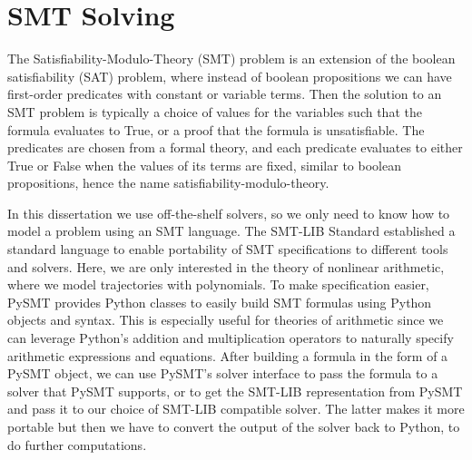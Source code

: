 \section{SMT Solving}
The Satisfiability-Modulo-Theory (SMT) problem is an extension of the boolean satisfiability (SAT) problem, where instead of boolean propositions we can have first-order predicates with constant or variable terms.
%
Then the solution to an SMT problem is typically a choice of values for the variables such that the formula evaluates to True, or a proof that the formula is unsatisfiable.
%
The predicates are chosen from a formal theory, and each predicate evaluates to either True or False when the values of its terms are fixed, similar to boolean propositions, hence the name satisfiability-modulo-theory.



In this dissertation we use off-the-shelf solvers, so we only need to know how to model a problem using an SMT language.
%
The SMT-LIB Standard \cite{Barrett.2010} established a standard language to enable portability of SMT specifications to different tools and solvers.
%
Here, we are only interested in the theory of nonlinear arithmetic, where we model trajectories with polynomials.
%
To make specification easier, PySMT \cite{PySMT.2015} provides Python classes to easily build SMT formulas using Python objects and syntax.
%
This is especially useful for theories of arithmetic since we can leverage Python's addition and multiplication operators to naturally specify arithmetic expressions and equations.
%
After building a formula in the form of a PySMT object, we can use PySMT's solver interface to pass the formula to a solver that PySMT supports, or to get the SMT-LIB representation from PySMT and pass it to our choice of SMT-LIB compatible solver.
%
The latter makes it more portable but then we have to convert the output of the solver back to Python, to do further computations.

